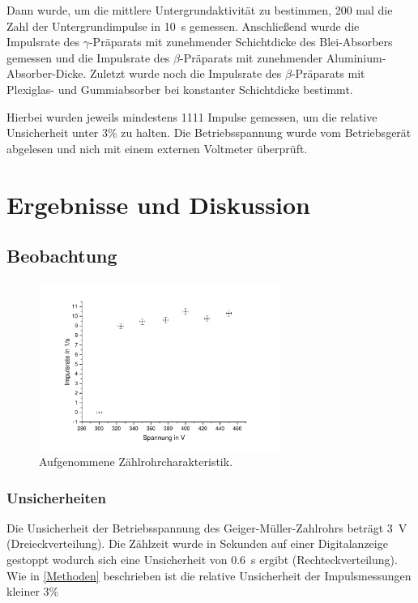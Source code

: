 \documentclass[
	a4paper,
	12pt,
	pagesize,
	ngerman
]{scrartcl}
\begin{document}
	Dann wurde, um die mittlere Untergrundaktivität zu bestimmen, 200 mal die Zahl der Untergrundimpulse in \SI{10}{\second} gemessen.
	Anschließend wurde die Impulsrate des $\gamma$-Präparats mit zunehmender Schichtdicke des Blei-Absorbers gemessen und die Impulsrate des $\beta$-Präparats mit zunehmender Aluminium-Absorber-Dicke.
	Zuletzt wurde noch die Impulsrate des $\beta$-Präparats mit Plexiglas- und Gummiabsorber bei konstanter Schichtdicke bestimmt.
	
	Hierbei wurden jeweils mindestens 1111 Impulse gemessen, um die relative Unsicherheit unter 3\% zu halten.
	Die Betriebsspannung wurde vom Betriebsgerät abgelesen und nich mit einem externen Voltmeter überprüft.
	
	
	\section{Ergebnisse und Diskussion}
	

	\subsection{Beobachtung}
	\begin{figure}[H]
		\includegraphics[width=0.7\textwidth]{Zaehlrohrcharakteristik}
		\centering
		\caption{Aufgenommene Zählrohrcharakteristik. }
		\label{Zaehlrohrcharakteristik}
		\centering
	\end{figure}
	\subsubsection{Unsicherheiten}
	Die Unsicherheit der Betriebsspannung des Geiger-Müller-Zahlrohrs beträgt \SI{3}{V} (Dreieckverteilung). 
	Die Zählzeit wurde in Sekunden auf einer Digitalanzeige gestoppt wodurch sich eine Unsicherheit von \SI{0,6}{s} ergibt (Rechteckverteilung).
	Wie in \cref{Methoden} beschrieben ist die relative Unsicherheit der Impulsmessungen kleiner 3\%
\end{document}
